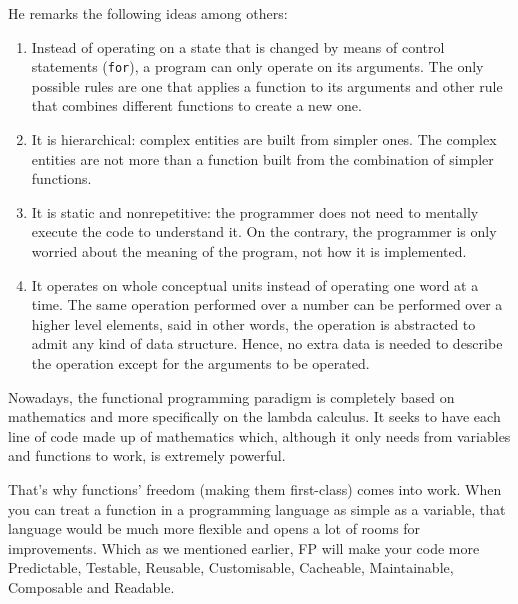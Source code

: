 He remarks the following ideas among others:
\begin{enumerate}
    \item Instead of operating on a state that is changed by means of control statements (\texttt{for}), a program can only operate on its arguments. 
    The only possible rules are one that applies a function to its arguments and other rule that combines different functions to create a new one. 
    
    \item It is hierarchical: complex entities are built from simpler ones. 
    The complex entities are not more than a function built from the combination of simpler functions.
    
    \item It is static and nonrepetitive: the programmer does not need to mentally execute the code to understand it. 
    On the contrary, the programmer is only worried about the meaning of the program, not how it is implemented. 
    
    \item It operates on whole conceptual units instead of operating one word at a time. 
    The same operation performed over a number can be performed over a higher level elements, said in other words, 
    the operation is abstracted to admit any kind of data structure.
    Hence, no extra data is needed to describe the operation except for the arguments to be operated. 
    
\end{enumerate}
 
Nowadays, the functional programming paradigm is completely based on mathematics and 
more specifically on the lambda calculus. 
It seeks to have each line of code made up of mathematics which, 
although it only needs from variables and functions to work, is extremely powerful.


 
 
 



That’s why functions’ freedom (making them first-class) comes into work. 
When you can treat a function in a programming language as simple as a variable, that language would be much more flexible and opens a lot of rooms for improvements. 
Which as we mentioned earlier, FP will make your code more Predictable, Testable, Reusable, Customisable, Cacheable, Maintainable, Composable and Readable.
 
